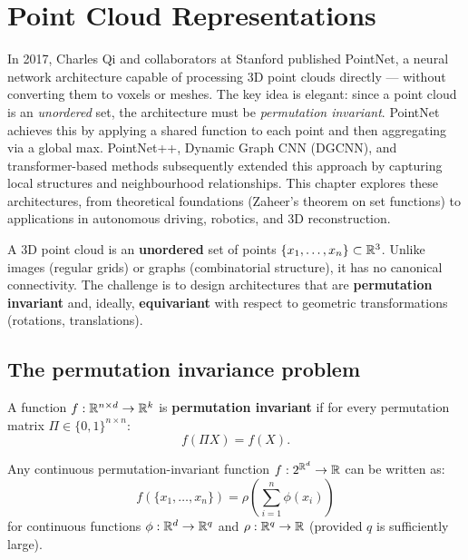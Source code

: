 \chapter{Point Cloud Representations}
\label{ch:point_clouds}

In 2017, Charles Qi and collaborators at Stanford published PointNet, a neural network architecture capable of processing 3D point clouds directly --- without converting them to voxels or meshes. The key idea is elegant: since a point cloud is an \emph{unordered} set, the architecture must be \emph{permutation invariant}. PointNet achieves this by applying a shared function to each point and then aggregating via a global max. PointNet++, Dynamic Graph CNN (DGCNN), and transformer-based methods subsequently extended this approach by capturing local structures and neighbourhood relationships. This chapter explores these architectures, from theoretical foundations (Zaheer's theorem on set functions) to applications in autonomous driving, robotics, and 3D reconstruction.

\begin{intuition}
A 3D point cloud is an \textbf{unordered} set
of points $\{x_1, \ldots, x_n\} \subset \mathbb{R}^3$. Unlike images
(regular grids) or graphs (combinatorial structure), it has no
canonical connectivity. The challenge is to design architectures
that are \textbf{permutation invariant} and, ideally,
\textbf{equivariant} with respect to geometric transformations
(rotations, translations).
\end{intuition}

\section{The permutation invariance problem}

\begin{definition}
A function $f : \mathbb{R}^{n \times d} \to \mathbb{R}^k$ is
\textbf{permutation invariant} if for every permutation matrix
$\Pi \in \{0,1\}^{n \times n}$:
\[
  f(\Pi X) = f(X).
\]
\end{definition}

\begin{theorem}
\label{thm:deepsets}
Any continuous permutation-invariant function
$f : 2^{\mathbb{R}^d} \to \mathbb{R}$ can be written as:
\[
  f(\{x_1, \ldots, x_n\}) = \rho\!\left(
  \sum_{i=1}^n \phi(x_i)\right)
\]
for continuous functions $\phi : \mathbb{R}^d \to \mathbb{R}^q$ and
$\rho : \mathbb{R}^q \to \mathbb{R}$ (provided $q$ is sufficiently large).
\end{theorem}

